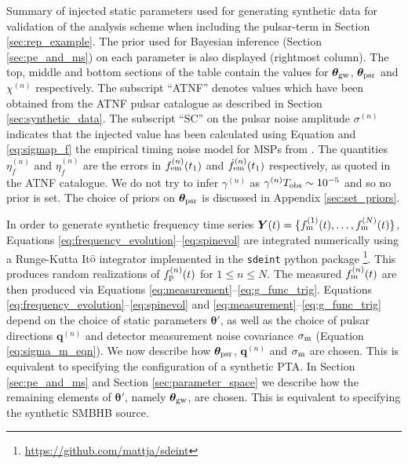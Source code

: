 \documentclass[fleqn,usenatbib,useAMS]{mnras}
\begin{document}
\begin{table}
		\caption{Summary of injected static parameters used for generating synthetic data for validation of the analysis scheme when including the pulsar-term in Section \ref{sec:rep_example}. The prior used for Bayesian inference (Section \ref{sec:pe_and_ms}) on each parameter is also displayed (rightmost column).  The top, middle and bottom sections of the table contain the values for $\boldsymbol{\theta}_{\rm gw}$, $\boldsymbol{\theta}_{\rm psr}$ and $\chi^{(n)}$ respectively. The subscript ``ATNF'' denotes values which have been obtained from the ATNF pulsar catalogue as described in Section \ref{sec:synthetic_data}. The subscript ``SC'' on the pulsar noise amplitude $\sigma^{(n)}$ indicates that the injected value has been calculated using Equation and \eqref{eq:sigmap_f} the empirical timing noise model for MSPs from \protect \cite{Shannon2010}. The quantities $\eta^{(n)}_{f}$ and $\eta^{(n)}_{\dot{f}}$ are the errors in $f^{(n)}_{\rm em} (t_1)$ and $\dot{f}^{(n)}_{\rm em} (t_1)$ respectively, as quoted in the ATNF catalogue. We do not try to infer $\gamma^{(n)}$ as $\gamma^{(n)} T_{\rm obs} \sim 10^{-5}$ and so no prior is set. The choice of priors on $\boldsymbol{\theta}_{\rm psr}$ is discussed in Appendix \ref{sec:set_priors}.
		}
		\label{tab:parameters_and_priors}
	\end{table}
In order to generate synthetic frequency time series $ \boldsymbol{Y}(t) = \{f_{\rm m}^{(1)}(t), \dots, f_{\rm m}^{(N)}(t) \}$, Equations \eqref{eq:frequency_evolution}--\eqref{eq:spinevol} are integrated numerically using a Runge-Kutta It$\hat{\text{o}}$ integrator implemented in the \texttt{sdeint} python package \footnote{\url{https://github.com/mattja/sdeint}}. This produces random realizations of $f_{\rm p}^{(n)}(t)$ for $1\leq n \leq N$. The measured $f_{\rm m}^{(n)}(t)$ are then produced via Equations \eqref{eq:measurement}--\eqref{eq:g_func_trig}. Equations \eqref{eq:frequency_evolution}--\eqref{eq:spinevol} and \eqref{eq:measurement}--\eqref{eq:g_func_trig} depend on the choice of static parameters $\boldsymbol{\theta'}$, as well as the choice of pulsar directions ${\boldsymbol{q}}^{(n)}$ and detector measurement noise covariance $\sigma_{\rm m}$ (Equation \eqref{eq:sigma_m_eqn}). We now describe how $\boldsymbol{\theta}_{\rm psr}$, ${\boldsymbol{q}}^{(n)}$ and $\sigma_{\rm m}$ are chosen. This is equivalent to specifying the configuration of a synthetic PTA. In Section  \ref{sec:pe_and_ms} and Section \ref{sec:parameter_space} we describe how the remaining elements of $\boldsymbol{\theta}'$, namely $\boldsymbol{\theta}_{\rm gw}$, are chosen. This is equivalent to specifying the synthetic SMBHB source.  \newline 
\end{document}
